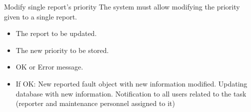 \begin{requirement}{Modify single report's priority}
\reqdesc The system must allow modifying the priority given to a single report. 
\reqin \begin{itemize}
\item The report to be updated.
\item The new priority to be stored.
\end{itemize}
\reqout \begin{itemize}
	\item OK or Error message.
	\item If OK:
	\subitem New reported fault object with new information modified.
	\subitem Updating database with new information.
	\subitem Notification to all users related to the task (reporter and maintenance personnel assigned to it)
\end{itemize}

\end{requirement}